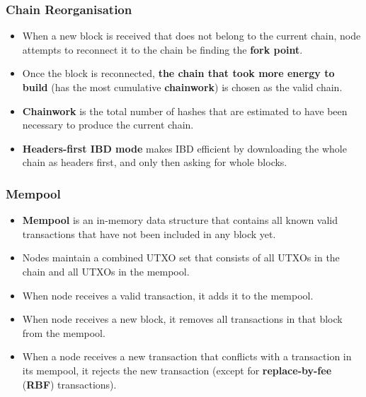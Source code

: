 \documentclass{beamer}
\begin{document}
\begin{frame}
  \frametitle{Chain Reorganisation}
  \begin{itemize}
  \item When a new block is received that does not belong to the current chain,
    node attempts to reconnect it to the chain be finding the \textbf{fork
      point}.
  \item Once the block is reconnected, \textbf{the chain that took more energy
      to build} (has the most cumulative \textbf{chainwork}) is chosen as the
    valid chain.
  \item \textbf{Chainwork} is the total number of hashes that are estimated to
    have been necessary to produce the current chain.
  \item \textbf{Headers-first IBD mode} makes IBD efficient by downloading the
    whole chain as headers first, and only then asking for whole blocks.
  \end{itemize}
\end{frame}

\begin{frame}
  \frametitle{Mempool}
  \begin{itemize}
  \item \textbf{Mempool} is an in-memory data structure that contains all known
    valid transactions that have not been included in any block yet.
  \item Nodes maintain a combined UTXO set that consists of all UTXOs in the
    chain and all UTXOs in the mempool.
  \item When node receives a valid transaction, it adds it to the mempool.
  \item When node receives a new block, it removes all transactions in that
    block from the mempool.
  \item When a node receives a new transaction that conflicts with a transaction
    in its mempool, it rejects the new transaction (except for
    \textbf{replace-by-fee} (\textbf{RBF}) transactions).
  \end{itemize}
\end{frame}
\end{document}
